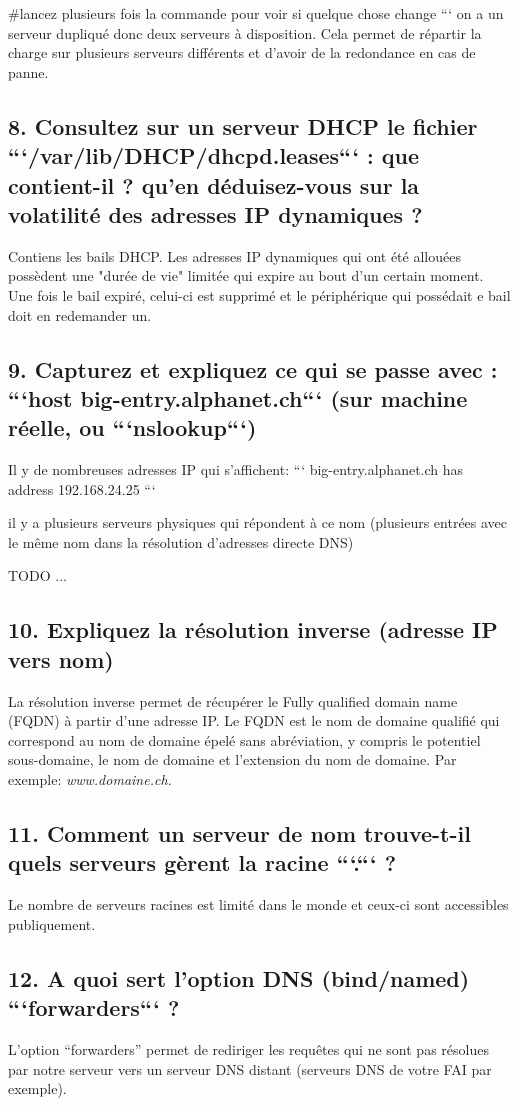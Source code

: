 \documentclass{article}
\begin{document}
\#lancez plusieurs fois la commande pour voir si quelque chose change
```
on a un serveur dupliqué donc deux serveurs à disposition. Cela permet de répartir la charge sur plusieurs serveurs différents et d'avoir de la redondance en cas de panne.

\subsection*{8. Consultez sur un serveur DHCP le fichier ```/var/lib/DHCP/dhcpd.leases``` : que contient-il ? qu’en déduisez-vous sur la volatilité des adresses IP dynamiques ?}
Contiens les bails DHCP. Les adresses IP dynamiques qui ont été allouées possèdent une "durée de vie" limitée qui expire au bout d'un certain moment. Une fois le bail expiré, celui-ci est supprimé et le périphérique qui possédait e bail doit en redemander un.

\subsection*{9. Capturez et expliquez ce qui se passe avec : ```host big-entry.alphanet.ch``` (sur machine réelle, ou ```nslookup```)}
Il y de nombreuses adresses IP qui s'affichent:
```
big-entry.alphanet.ch has address 192.168.24.25
```

il y a plusieurs serveurs physiques qui répondent à ce nom (plusieurs entrées avec le même nom dans la résolution d'adresses directe DNS)

TODO ...

\subsection*{10. Expliquez la résolution inverse (adresse IP vers nom)}
La résolution inverse permet de récupérer le Fully qualified domain name (FQDN) à partir d'une adresse IP. Le FQDN est le nom de domaine qualifié qui correspond au nom de domaine épelé sans abréviation, y compris le potentiel sous-domaine, le nom de domaine et l'extension du nom de domaine. Par exemple:
\textit{www.domaine.ch.}

\subsection*{11. Comment un serveur de nom trouve-t-il quels serveurs gèrent la racine ```.``` ?}
Le nombre de serveurs racines est limité dans le monde et ceux-ci sont accessibles publiquement.

\subsection*{12. A quoi sert l’option DNS (bind/named) ```forwarders``` ?}
L'option “forwarders” permet de rediriger les requêtes qui ne sont pas résolues par notre serveur vers un serveur DNS distant (serveurs DNS de votre FAI par exemple).
\end{document}
